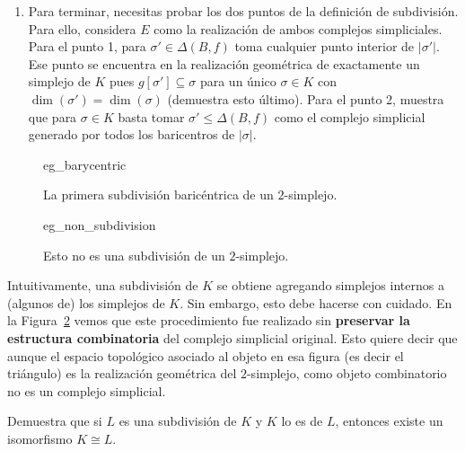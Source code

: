 \documentclass{standalone}
\begin{document}
\begin{exercise}
\begin{enumerate}
			\item Para terminar, necesitas probar los dos puntos de la definición de subdivisión. Para ello, considera $E$ como la realización de ambos complejos simpliciales. Para el punto 1, para $\sigma'\in\Delta(B,f)$ toma cualquier punto interior de $|\sigma'|$. Ese punto se encuentra en la realización geométrica de exactamente un simplejo de $K$ pues $g[\sigma']\subseteq \sigma$ para un único $\sigma\in K$ con $\dim(\sigma') = \dim(\sigma)$ (demuestra esto último). Para el punto 2, muestra que para $\sigma\in K$ basta tomar $\sigma'\leq \Delta(B,f)$ como el complejo simplicial generado por todos los baricentros de $|\sigma|$.
		\end{enumerate}
	\end{exercise}
	
	\begin{figure}
		\centering
		{eg_barycentric}
		\caption{La primera subdivisión baricéntrica de un $2$-simplejo.}
		\label{fig:eg_barycentric}
	\end{figure}
	
	\begin{figure}
		\centering
		{eg_non_subdivision}
		\caption{Esto no es una subdivisión de un $2$-simplejo.}
		\label{fig:eg_non_subdivision}
	\end{figure}
	
	Intuitivamente, una subdivisión de $K$ se obtiene agregando simplejos internos a (algunos de) los simplejos de $K$. Sin embargo, esto debe hacerse con cuidado. En la Figura~\ref{fig:eg_non_subdivision} vemos que este procedimiento fue realizado sin \textbf{preservar la estructura combinatoria} del complejo simplicial original. Esto quiere decir que aunque el espacio topológico asociado al objeto en esa figura (es decir el triángulo) es la realización geométrica del $2$-simplejo, como objeto combinatorio no es un complejo simplicial. 
	
	\begin{exercise}\label{ex:subdivision_iso}
		Demuestra que si $L$ es una subdivisión de $K$ y $K$ lo es de $L$, entonces existe un isomorfismo $K\cong L$.
	\end{exercise}
	
\end{document}
